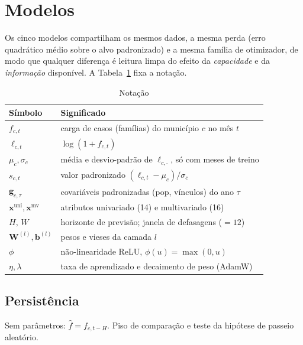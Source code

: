 \documentclass[12pt,a4paper,oneside]{article}
\begin{document}
\section{Modelos}
\label{sec:modelos}

Os cinco modelos compartilham os mesmos dados, a mesma perda (erro
quadrático médio sobre o alvo padronizado) e a mesma família de
otimizador, de modo que qualquer diferença é leitura limpa do efeito da
\emph{capacidade} e da \emph{informação} disponível. A
Tabela~\ref{tab:notacao} fixa a notação.

\begin{table}[H]
\centering
\caption{Notação}
\label{tab:notacao}
\small
\begin{tabular}{@{}ll@{}}
\toprule
\textbf{Símbolo} & \textbf{Significado} \\
\midrule
$f_{c,t}$               & carga de casos (famílias) do município $c$ no mês $t$ \\
$\ell_{c,t}$            & $\log(1+f_{c,t})$ \\
$\mu_c,\sigma_c$        & média e desvio-padrão de $\ell_{c,\cdot}$, só com meses de treino \\
$s_{c,t}$               & valor padronizado $(\ell_{c,t}-\mu_c)/\sigma_c$ \\
$\bm g_{c,\tau}$        & covariáveis padronizadas (pop, vínculos) do ano $\tau$ \\
$\bm x^{\text{uni}},\bm x^{\text{mv}}$ & atributos univariado (14) e multivariado (16) \\
$H,\,W$                 & horizonte de previsão; janela de defasagens ($=12$) \\
$\bm W^{(l)},\bm b^{(l)}$ & pesos e vieses da camada $l$ \\
$\phi$                  & não-linearidade ReLU, $\phi(u)=\max(0,u)$ \\
$\eta,\lambda$          & taxa de aprendizado e decaimento de peso (AdamW) \\
\bottomrule
\end{tabular}
\end{table}

\subsection{Persistência}

Sem parâmetros: $\widehat{f}=f_{c,t-H}$. Piso de comparação e teste da
hipótese de passeio aleatório.
\end{document}
